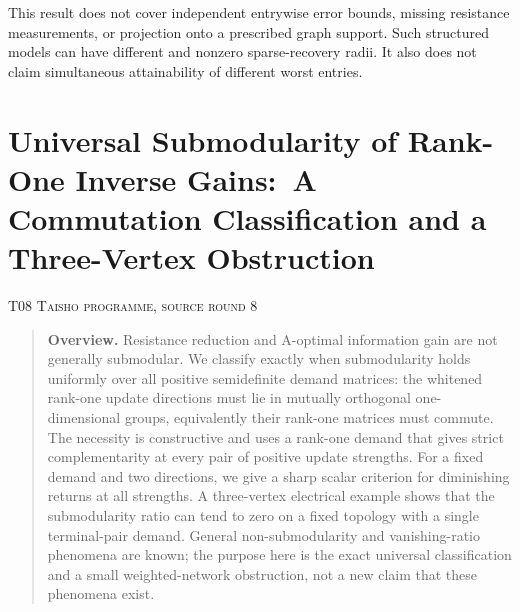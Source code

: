 \documentclass[11pt,a4paper]{article}
\theoremstyle{definition}\newtheorem{definition}[theorem]{Definition}
\theoremstyle{remark}\newtheorem{remark}[theorem]{Remark}
\numberwithin{equation}{section}
\begin{document}
This result does not cover independent entrywise error bounds, missing resistance measurements, or projection onto a prescribed graph support. Such structured models can have different and nonzero sparse-recovery radii. It also does not claim simultaneous attainability of different worst entries.




\clearpage
\section[T08 --- Universal Submodularity of Rank-One Inverse Gains:\ A Commutation Classification and a Three-Vertex Obstruction]{Universal Submodularity of Rank-One Inverse Gains:\ A Commutation Classification and a Three-Vertex Obstruction}\label{contrib-T08}
\noindent\textsc{T08 \quad Taisho programme, source round 8}\par\medskip



\begin{quote}\small\textbf{Overview.} Resistance reduction and A-optimal information gain are not generally submodular. We classify exactly when submodularity holds uniformly over all positive semidefinite demand matrices: the whitened rank-one update directions must lie in mutually orthogonal one-dimensional groups, equivalently their rank-one matrices must commute. The necessity is constructive and uses a rank-one demand that gives strict complementarity at every pair of positive update strengths. For a fixed demand and two directions, we give a sharp scalar criterion for diminishing returns at all strengths. A three-vertex electrical example shows that the submodularity ratio can tend to zero on a fixed topology with a single terminal-pair demand. General non-submodularity and vanishing-ratio phenomena are known; the purpose here is the exact universal classification and a small weighted-network obstruction, not a new claim that these phenomena exist.\end{quote}
\end{document}
